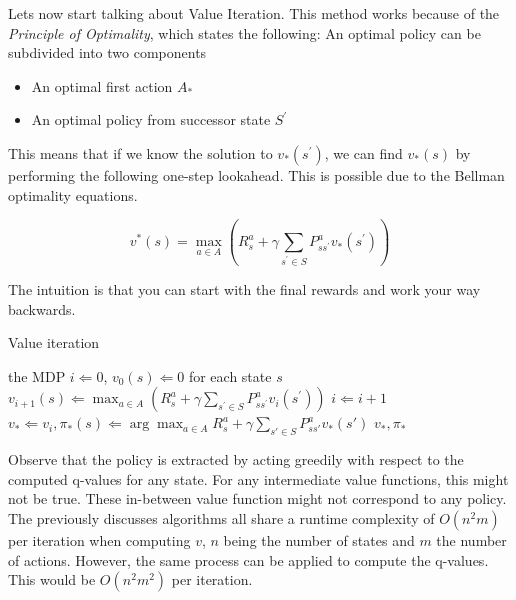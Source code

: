 Lets now start talking about Value Iteration. This method works because of the \textit{Principle of Optimality}, which states the following: An optimal policy can be subdivided into two components

\begin{itemize}
	\item An optimal first action $A_*$
	\item An optimal policy from successor state $S^\prime$
\end{itemize}

This means that if we know the solution to $v_*(s^\prime)$, we can find $v_*(s)$ by performing the following one-step lookahead. This is possible due to the Bellman optimality equations.

\begin{equation*}
		v^*(s) = \max_{a \in A} \left( R^a_s + \gamma \sum_{s^\prime \in S} P^a_{ss^\prime} v_*(s^\prime)\right)
\end{equation*}

The intuition is that you can start with the final rewards and work your way backwards. 

\begin{algorithm}[H]
	\caption{Value iteration}
	\label{alg:val-iter}
	\begin{algorithmic}
		\REQUIRE the MDP
		\STATE $i \Leftarrow 0$, $v_0(s) \Leftarrow 0$ for each state $s$
				\STATE $v_{i+1}(s) \Leftarrow 
				\max_{a \in A} \left(R^a_s + \gamma \sum_{s^\prime \in S} P^a_{ss^\prime} v_i(s^\prime)\right)$
			\ENDFOR
			\STATE $i \Leftarrow i + 1$
		\ENDWHILE
		\STATE $v_* \Leftarrow v_i, \pi_*(s) \Leftarrow \arg\max_{a \in A} R^a_s + \gamma\sum_{s' \in S} P^a_{ss'}v_*(s')$
		\RETURN $v_*, \pi_*$
	\end{algorithmic}
\end{algorithm}

Observe that the policy is extracted by acting greedily with respect to the computed q-values for any state. For any intermediate value functions, this might not be true. These in-between value function might not correspond to any policy.\\

The previously discusses algorithms all share a runtime complexity of $O(n^2m)$ per iteration when computing $v$, $n$ being the number of states and $m$ the number of actions. However, the same process can be applied to compute the q-values. This would be $O(n^2m^2)$ per iteration.

